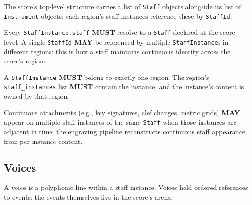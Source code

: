 \documentclass[11pt,letterpaper]{report}
\newcounter{requirement}[chapter]
\newcommand{\MUST}{\textbf{MUST}}
\newcommand{\MAY}{\textbf{MAY}}
\begin{document}
The score's top-level structure carries a list of \texttt{Staff}
objects alongside its list of \texttt{Instrument} objects; each
region's staff instances reference these by \texttt{StaffId}.

\begin{requirement}
  \label{req:graph:staff-instance-ownership}
  Every \texttt{StaffInstance.staff} \MUST{} resolve to a
  \texttt{Staff} declared at the score level. A single
  \texttt{StaffId} \MAY{} be referenced by multiple
  \texttt{StaffInstance}s in different regions: this is how a staff
  maintains continuous identity across the score's regions.

  A \texttt{StaffInstance} \MUST{} belong to exactly one region. The
  region's \texttt{staff\_instances} list \MUST{} contain the
  instance, and the instance's content is owned by that region.

  Continuous attachments (e.g., key signatures, clef changes, metric
  grids) \MAY{} appear on multiple staff instances of the same
  \texttt{Staff} when those instances are adjacent in time; the
  engraving pipeline reconstructs continuous staff appearance from
  per-instance content.
\end{requirement}

\subsection{Voices}

A voice is a polyphonic line within a staff instance. Voices hold
ordered references to events; the events themselves live in the
score's arena.
\end{document}
